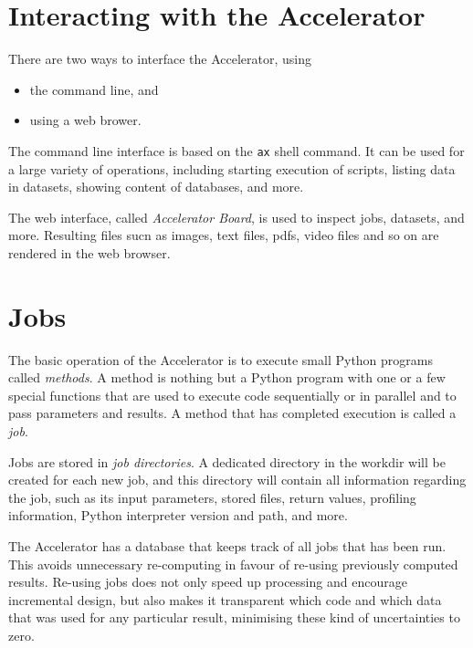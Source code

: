\section{Interacting with the Accelerator}
There are two ways to interface the Accelerator, using
\begin{itemize}
\item[] the command line, and
\item[] using a web brower.
\end{itemize}
The command line interface is based on the \texttt{ax} shell command.
It can be used for a large variety of operations, including starting
execution of scripts, listing data in datasets, showing content of
databases, and more.

The web interface, called \textsl{Accelerator Board}, is used to
inspect jobs, datasets, and more.  Resulting files sucn as images,
text files, pdfs, video files and so on are rendered in the web
browser.


\section{Jobs}
The basic operation of the Accelerator is to execute small Python
programs called \textsl{methods}.  A method is nothing but a Python
program with one or a few special functions that are used to execute
code sequentially or in parallel and to pass parameters and results.
A method that has completed execution is called a \textsl{job}.

Jobs are stored in \textsl{job directories}.  A dedicated directory in
the workdir will be created for each new job, and this directory will
contain all information regarding the job, such as its input
parameters, stored files, return values, profiling information, Python
interpreter version and path, and more.

The Accelerator has a database that keeps track of all jobs that has
been run.  This avoids unnecessary re-computing in favour of re-using
previously computed results.  Re-using jobs does not only speed up
processing and encourage incremental design, but also makes it
transparent which code and which data that was used for any particular
result, minimising these kind of uncertainties to zero.


